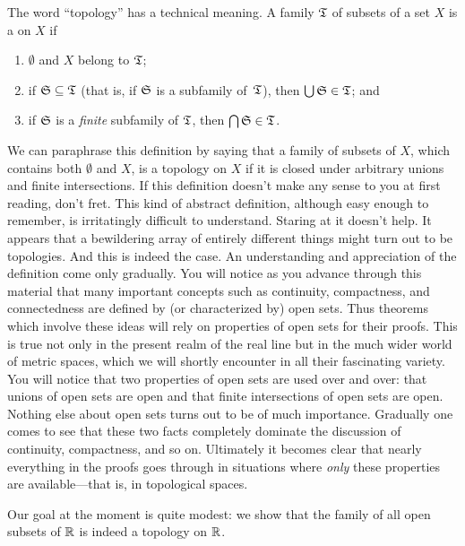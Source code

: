 \begin{defn} The word ``topology'' has a technical meaning.  A family $\mathfrak{T}$ of subsets
of a set $X$ is a
 on $X$ if
 \begin{enumerate}
   \item $\emptyset$ and $X$ belong to $\mathfrak{T}$;
   \item if $\mathfrak{S} \subseteq \mathfrak{T}$ (that is, if $\mathfrak{S}$ is a
subfamily of~$\mathfrak{T}$), then $\bigcup\mathfrak{S} \in \mathfrak{T}$; and
   \item if $\mathfrak{S}$ is a \emph{finite} subfamily of $\mathfrak{T}$, then
$\bigcap\mathfrak{S} \in \mathfrak{T}$.
 \end{enumerate}
\end{defn}

We can paraphrase this definition by saying that a family of subsets of $X$, which contains
both $\emptyset$ and $X$, is a topology on $X$ if it is closed under arbitrary unions and
finite intersections.  If this definition doesn't make any sense to you at first reading,
don't fret.  This kind of abstract definition, although easy enough to remember, is
irritatingly difficult to understand.  Staring at it doesn't help. It appears that a
bewildering array of entirely different things might turn out to be topologies.  And this is
indeed the case.  An understanding and appreciation of the definition come only gradually.
You will notice as you advance through this material that many important concepts such as
continuity, compactness, and connectedness are defined by (or characterized by) open sets.
Thus theorems which involve these ideas will rely on properties of open sets for their proofs.
This is true not only in the present realm of the real line but in the much wider world of
metric spaces, which we will shortly encounter in all their fascinating variety. You will
notice that two properties of open sets are used over and over: that unions of open sets are
open and that finite intersections of open sets are open.  Nothing else about open sets turns
out to be of much importance.  Gradually one comes to see that these two facts completely
dominate the discussion of continuity, compactness, and so on.  Ultimately it becomes clear
that nearly everything in the proofs goes through in situations where \emph{only} these
properties are available---that is, in topological spaces.

Our goal at the moment is quite modest: we show that the family of all open subsets of $\mathbb{R}$ is
indeed a topology on $\mathbb{R}$.

